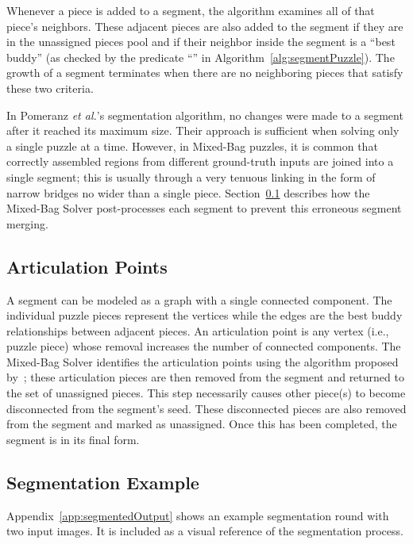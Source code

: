 Whenever a piece is added to a segment, the algorithm examines all of that piece's neighbors.  These adjacent pieces are also added to the segment if they are in the unassigned pieces pool and if their neighbor inside the segment is a ``best buddy'' (as checked by the predicate ``'' in Algorithm~\ref{alg:segmentPuzzle}).  The growth of a segment terminates when there are no neighboring pieces that satisfy these two criteria. 

In Pomeranz \textit{et al.}'s segmentation algorithm, no changes were made to a segment after it reached its maximum size.  Their approach is sufficient when solving only a single puzzle at a time.  However, in Mixed-Bag puzzles, it is common that correctly assembled regions from different ground-truth inputs are joined into a single segment; this is usually through a very tenuous linking in the form of narrow bridges no wider than a single piece.  Section~\ref{sec:articulationPoints} describes how the Mixed-Bag Solver post-processes each segment to prevent this erroneous segment merging.

\subsection{Articulation Points}\label{sec:articulationPoints}

A segment can be modeled as a graph with a single connected component.  The individual puzzle pieces represent the vertices while the edges are the best buddy relationships between adjacent pieces.  An articulation point is any vertex (i.e., puzzle piece) whose removal increases the number of connected components.  The Mixed-Bag Solver identifies the articulation points using the algorithm proposed by~\cite{cormenIntroToAlgorithms}; these articulation pieces are then removed from the segment and returned to the set of unassigned pieces.  This step necessarily causes other piece(s) to become disconnected from the segment's seed.  These disconnected pieces are also removed from the segment and marked as unassigned. Once this has been completed, the segment is in its final form.

\subsection{Segmentation Example}

Appendix~\ref{app:segmentedOutput} shows an example segmentation round with two input images. It is included as a visual reference of the segmentation process.

